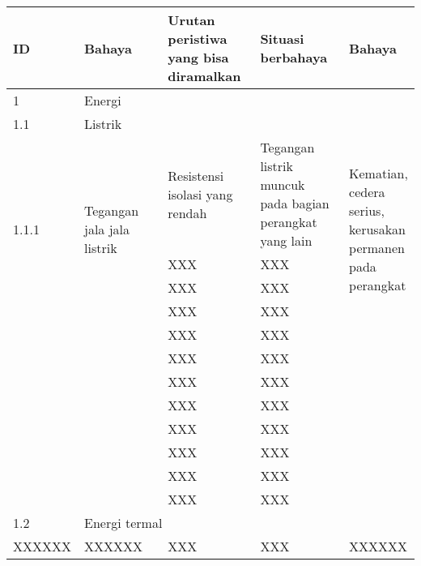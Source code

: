 \documentclass[11pt,a4paper,twoside,onecolumn]{book}
\begin{document}
		\begin{table}
			\begin{tabular}{p{0.1\linewidth} p{0.25\linewidth} p{0.25\linewidth} p{0.25\linewidth} p{0.15\linewidth}}
				\hline
				ID & Bahaya & Urutan peristiwa yang bisa diramalkan & Situasi berbahaya & Bahaya \\
				\hline
				\hline
				1 & \multicolumn{4}{l}{Energi} \\
				\hline
				1.1 & \multicolumn{4}{l}{Listrik} \\
				\hline
				\multirow{4}{0.1\linewidth}{1.1.1} & \multirow{4}{0.25\linewidth}{Tegangan jala jala listrik} 	& \multicolumn{1}{l}{Resistensi isolasi yang rendah} & \multicolumn{1}{l}{Tegangan listrik muncuk pada bagian perangkat yang lain} & \multirow{4}{*}{Kematian, cedera serius, kerusakan permanen pada perangkat} \\\cline{3-4}
																  &	& \multicolumn{1}{l}{XXX} & \multicolumn{1}{l}{XXX} & \\ \cline{3-4}
																  &	& \multicolumn{1}{l}{XXX} & \multicolumn{1}{l}{XXX} & \\ \cline{3-4}
																  &	& \multicolumn{1}{l}{XXX} & \multicolumn{1}{l}{XXX} & \\ \cline{3-4}
																  &	& \multicolumn{1}{l}{XXX} & \multicolumn{1}{l}{XXX} & \\ \cline{3-4}
																  &	& \multicolumn{1}{l}{XXX} & \multicolumn{1}{l}{XXX} & \\ \cline{3-4}
										 						  &	& \multicolumn{1}{l}{XXX} & \multicolumn{1}{l}{XXX} & \\ \cline{3-4}
										 						  &	& \multicolumn{1}{l}{XXX} & \multicolumn{1}{l}{XXX} & \\ \cline{3-4}
										 						  &	& \multicolumn{1}{l}{XXX} & \multicolumn{1}{l}{XXX} & \\ \cline{3-4}
										 						  &	& \multicolumn{1}{l}{XXX} & \multicolumn{1}{l}{XXX} & \\ \cline{3-4}
										 						  &	& \multicolumn{1}{l}{XXX} & \multicolumn{1}{l}{XXX} & \\ \cline{3-4}
										 						  &	& \multicolumn{1}{l}{XXX} & \multicolumn{1}{l}{XXX} & \\ \hline
				
				
				1.2 & \multicolumn{4}{l}{Energi termal} \\
				\hline
				{XXXXXX} & {XXXXXX} & {XXX} & {XXX} & {XXXXXX} \\
				

\end{tabular}
\end{table}
\end{document}
